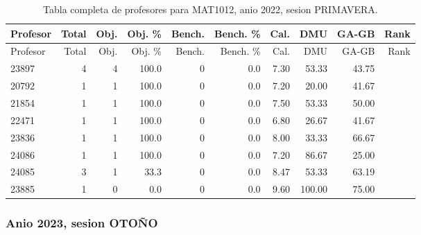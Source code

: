 \begingroup
\scriptsize
\setlength{\tabcolsep}{3pt}
\begin{longtable}{lrrrrrrrrr}
\caption{Tabla completa de profesores para MAT1012, anio 2022, sesion PRIMAVERA.}\label{tab:prof-period-mat1012-2022-primavera}\\
\toprule
Profesor & Total & Obj. & Obj. \% & Bench. & Bench. \% & Cal. & DMU & GA-GB & Rank \\
\midrule
\endfirsthead
\toprule
Profesor & Total & Obj. & Obj. \% & Bench. & Bench. \% & Cal. & DMU & GA-GB & Rank \\
\midrule
\endhead
23897 & 4 & 4 & 100.0 & 0 & 0.0 & 7.30 & 53.33 & 43.75 &  \\
20792 & 1 & 1 & 100.0 & 0 & 0.0 & 7.20 & 20.00 & 41.67 &  \\
21854 & 1 & 1 & 100.0 & 0 & 0.0 & 7.50 & 53.33 & 50.00 &  \\
22471 & 1 & 1 & 100.0 & 0 & 0.0 & 6.80 & 26.67 & 41.67 &  \\
23836 & 1 & 1 & 100.0 & 0 & 0.0 & 8.00 & 33.33 & 66.67 &  \\
24086 & 1 & 1 & 100.0 & 0 & 0.0 & 7.20 & 86.67 & 25.00 &  \\
24085 & 3 & 1 & 33.3 & 0 & 0.0 & 8.47 & 53.33 & 63.19 &  \\
23885 & 1 & 0 & 0.0 & 0 & 0.0 & 9.60 & 100.00 & 75.00 &  \\
\bottomrule
\end{longtable}
\endgroup

\subsubsection{Anio 2023, sesion OTOÑO}

